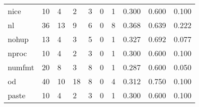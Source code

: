 \begin{longtable}{lp{2.0cm}p{2.0cm}p{2.0cm}p{2.0cm}p{2.0cm}p{2.0cm}p{2.0cm}p{2.0cm}p{2.0cm}}
nice      &                     10 &                                             4 &                                            2 &                                           3 &                                            0 &                                          1 &                                0.300 &                                  0.600 &                                0.100 \\
nl        &                     36 &                                            13 &                                            9 &                                           6 &                                            0 &                                          8 &                                0.368 &                                  0.639 &                                0.222 \\
nohup     &                     13 &                                             4 &                                            3 &                                           5 &                                            0 &                                          1 &                                0.327 &                                  0.692 &                                0.077 \\
nproc     &                     10 &                                             4 &                                            2 &                                           3 &                                            0 &                                          1 &                                0.300 &                                  0.600 &                                0.100 \\
numfmt    &                     20 &                                             8 &                                            3 &                                           8 &                                            0 &                                          1 &                                0.287 &                                  0.600 &                                0.050 \\
od        &                     40 &                                            10 &                                           18 &                                           8 &                                            0 &                                          4 &                                0.312 &                                  0.750 &                                0.100 \\
paste     &                     10 &                                             4 &                                            2 &                                           3 &                                            0 &                                          1 &                                0.300 &                                  0.600 &                                0.100 \\

\end{longtable}
